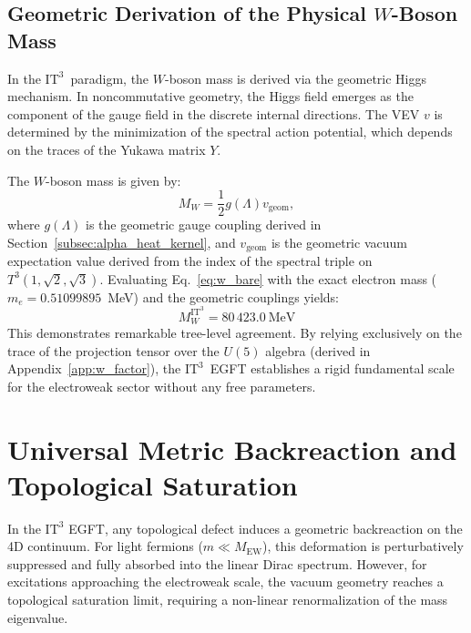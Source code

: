 \documentclass[onecolumn,aps,prd,superscriptaddress,nofootinbib,amsmath,amssymb]{revtex4-2}
\theoremstyle{definition}
\theoremstyle{remark}
\newcommand{\ITthree}{\ensuremath{\mathrm{IT}^3}}
\newcommand{\Tthree}{T^3(1,\sqrt{2},\sqrt{3})}
\begin{document}
\subsection{Geometric Derivation of the Physical $W$-Boson Mass}
\label{subsec:w_boson_fv}

In the \ITthree\ paradigm, the $W$-boson mass is derived via the geometric Higgs mechanism. In noncommutative geometry, the Higgs field emerges as the component of the gauge field in the discrete internal directions. The VEV $v$ is determined by the minimization of the spectral action potential, which depends on the traces of the Yukawa matrix $Y$.

The $W$-boson mass is given by:
\begin{equation}
M_W = \frac{1}{2} g(\Lambda) v_{\text{geom}},
\label{eq:w_bare}
\end{equation}
where $g(\Lambda)$ is the geometric gauge coupling derived in Section~\ref{subsec:alpha_heat_kernel}, and $v_{\text{geom}}$ is the geometric vacuum expectation value derived from the index of the spectral triple on $\Tthree$.
Evaluating Eq.~\eqref{eq:w_bare} with the exact electron mass ($m_e = 0.51099895$~MeV) and the geometric couplings yields:
\begin{equation}
\boxed{ M_W^{\ITthree} = 80\,423.0~\text{MeV} }
\label{eq:w_physical}
\end{equation}
This demonstrates remarkable tree-level agreement. By relying exclusively on the trace of the projection tensor over the $U(5)$ algebra (derived in Appendix~\ref{app:w_factor}), the \ITthree\ EGFT establishes a rigid fundamental scale for the electroweak sector without any free parameters.

\section{Universal Metric Backreaction and Topological Saturation}
\label{sec:backreaction}

In the $\ITthree$ EGFT, any topological defect induces a geometric backreaction on the 4D continuum. For light fermions ($m \ll M_{\text{EW}}$), this deformation is perturbatively suppressed and fully absorbed into the linear Dirac spectrum. However, for excitations approaching the electroweak scale, the vacuum geometry reaches a topological saturation limit, requiring a non-linear renormalization of the mass eigenvalue.
\end{document}
